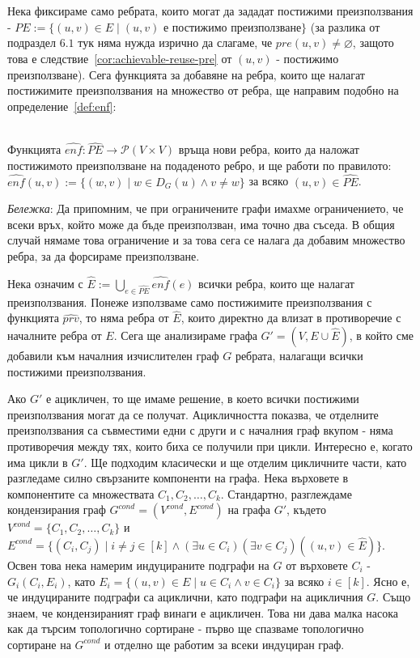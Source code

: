 \documentclass[12pt,twoside,a4paper]{article}
\begin{document}
	\newpage
	Нека фиксираме само ребрата, които могат да зададат постижими преизползвания - $\hat{PE} := \{(u,v) \in E \mid (u,v)\text{ е постижимо преизползване}\}$ (за разлика от подраздел $6.1$ тук няма нужда изрично да слагаме, че $pre(u,v) \neq \varnothing$, защото това е следствие~\ref{cor:achievable-reuse-pre} от $(u,v)$ - постижимо преизползване). Сега функцията за добавяне на ребра, които ще налагат постижимите преизползвания на множество от ребра, ще направим подобно на определение~\ref{def:enf}:
	
	\begin{definition}\label{def:hat-enf}~\\
		\indent Функцията $\hat{enf} \colon \hat{PE} \to \mathcal{P}(V \times V)$ връща нови ребра, които да наложат постижимото преизползване на подаденото ребро, и ще работи по правилото: $\hat{enf}(u,v):=\{(w, v) \mid w \in D_G(u) \land v \neq w\}$ за всяко $(u,v) \in \hat{PE}$.
		
		\textit{Бележка}: Да припомним, че при ограничените графи имахме ограничението, че всеки връх, който може да бъде преизползван, има точно два съседа. В общия случай нямаме това ограничение и за това сега се налага да добавим множество ребра, за да форсираме преизползване.
	\end{definition}
	
	Нека означим с $\hat{E}:=\bigcup_{e \in \hat{PE}}{\hat{enf}(e)}$ всички ребра, които ще налагат преизползвания. Понеже използваме само постижимите преизползвания с функцията $\hat{prv}$, то няма ребра от $\hat{E}$, които директно да влизат в противоречие с началните ребра от $E$. Сега ще анализираме графа $G'=(V,E \cup \hat{E})$, в който сме добавили към началния изчислителен граф $G$ ребрата, налагащи всички постижими преизползвания.
	
	Ако $G'$ е ацикличен, то ще имаме решение, в което всички постижими преизползвания могат да се получат. Ацикличността показва, че отделните преизползвания са съвместими едни с други и с началния граф вкупом - няма противоречия между тях, които биха се получили при цикли. Интересно е, когато има цикли в $G'$. Ще подходим класически и ще отделим цикличните части, като разгледаме силно свързаните компоненти на графа. Нека върховете в компонентите са множествата $C_1, C_2, \dots, C_k$. Стандартно, разглеждаме кондензирания граф $G^{cond}=(V^{cond},E^{cond})$ на графа $G'$, където $V^{cond}=\{C_1, C_2, \dots, C_k\}$ и $E^{cond}=\{(C_i, C_j) \mid i \neq j \in [k] \land (\exists u \in C_i)(\exists v \in C_j)((u,v) \in \hat{E})\}$. Освен това нека намерим индуцираните подграфи на $G$ от върховете $C_i$ - $G_i(C_i, E_i)$, като $E_i=\{(u,v) \in E \mid u \in C_i \land v \in C_i\}$ за всяко $i \in [k]$. Ясно е, че индуцираните подграфи са ациклични, като подграфи на ацикличния $G$. Също знаем, че кондензираният граф винаги е ацикличен. Това ни дава малка насока как да търсим топологично сортиране - първо ще спазваме топологично сортиране на $G^{cond}$ и отделно ще работим за всеки индуциран граф.
	
\end{document}
